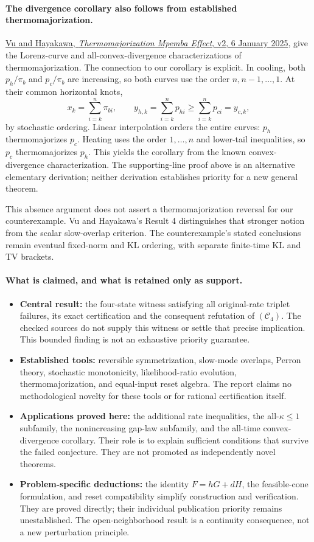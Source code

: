 \paragraph{The divergence corollary also follows from established thermomajorization.}
\href{https://arxiv.org/html/2410.06686v2}{Vu and Hayakawa, \emph{Thermomajorization Mpemba Effect}, v2, 6 January 2025}, give the Lorenz-curve and all-convex-divergence characterizations of thermomajorization. The connection to our corollary is explicit. In cooling, both $p_h/\pi_b$ and $p_c/\pi_b$ are increasing, so both curves use the order $n,n-1,\ldots,1$. At their common horizontal knots,
\[
x_k=\sum_{i=k}^n\pi_{bi},\qquad
y_{h,k}=\sum_{i=k}^np_{hi}\geq\sum_{i=k}^np_{ci}=y_{c,k},
\]
by stochastic ordering. Linear interpolation orders the entire curves: $p_h$ thermomajorizes $p_c$. Heating uses the order $1,\ldots,n$ and lower-tail inequalities, so $p_c$ thermomajorizes $p_h$. This yields the corollary from the known convex-divergence characterization. The supporting-line proof above is an alternative elementary derivation; neither derivation establishes priority for a new general theorem.

This absence argument does not assert a thermomajorization reversal for our counterexample. Vu and Hayakawa's Result 4 distinguishes that stronger notion from the scalar slow-overlap criterion. The counterexample's stated conclusions remain eventual fixed-norm and KL ordering, with separate finite-time KL and TV brackets.

\paragraph{What is claimed, and what is retained only as support.}
\begin{itemize}
\item \textbf{Central result:} the four-state witness satisfying all original-rate triplet failures, its exact certification and the consequent refutation of $(\mathcal C_4)$. The checked sources do not supply this witness or settle that precise implication. This bounded finding is not an exhaustive priority guarantee.
\item \textbf{Established tools:} reversible symmetrization, slow-mode overlaps, Perron theory, stochastic monotonicity, likelihood-ratio evolution, thermomajorization, and equal-input reset algebra. The report claims no methodological novelty for these tools or for rational certification itself.
\item \textbf{Applications proved here:} the additional rate inequalities, the all-$\kappa\leq1$ subfamily, the nonincreasing gap-law subfamily, and the all-time convex-divergence corollary. Their role is to explain sufficient conditions that survive the failed conjecture. They are not promoted as independently novel theorems.
\item \textbf{Problem-specific deductions:} the identity $F=hG+dH$, the feasible-cone formulation, and reset compatibility simplify construction and verification. They are proved directly; their individual publication priority remains unestablished. The open-neighborhood result is a continuity consequence, not a new perturbation principle.
\end{itemize}

